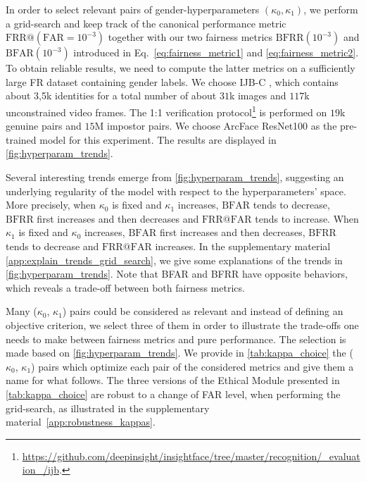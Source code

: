 \documentclass[nohyperref]{article}
\theoremstyle{plain}
\theoremstyle{definition}
\theoremstyle{remark}
\begin{document}
In order to select relevant pairs of gender-hyperparameters $(\kappa_0, \kappa_1)$, we perform a grid-search and keep track of the canonical performance metric $\mathrm{FRR}@(\mathrm{FAR}=10^{-3})$ together with our two fairness metrics $\mathrm{BFRR}(10^{-3})$ and $\mathrm{BFAR}(10^{-3})$ introduced in Eq.~\ref{eq:fairness_metric1} and \ref{eq:fairness_metric2}. To obtain reliable results, we need to compute the latter metrics on a sufficiently large FR dataset containing gender labels. We choose IJB-C \cite{maze2018iarpa}, which contains about 3,5k identities for a total number of about $31$k images and $117$k unconstrained video frames. The 1:1 verification protocol\footnote{\url{https://github.com/deepinsight/insightface/tree/master/recognition/_evaluation_/ijb}.}  is performed on $19$k genuine pairs and $15$M impostor pairs. We choose ArcFace ResNet100 as the pre-trained model for this experiment. The results are displayed in \autoref{fig:hyperparam_trends}.



Several interesting trends emerge from \autoref{fig:hyperparam_trends}, suggesting an underlying regularity of the model with respect to the hyperparameters' space. More precisely, when $\kappa_0$ is fixed and $\kappa_1$ increases, $\mathrm{BFAR}$ tends to decrease, $\mathrm{BFRR}$ first increases and then decreases and $\mathrm{FRR} @ \mathrm{FAR}$ tends to increase. When $\kappa_1$ is fixed and $\kappa_0$ increases, $\mathrm{BFAR}$ first increases and then decreases, $\mathrm{BFRR}$ tends to decrease and $\mathrm{FRR} @ \mathrm{FAR}$ increases. In the supplementary material \ref{app:explain_trends_grid_search}, we give some explanations of the trends in \autoref{fig:hyperparam_trends}. Note that BFAR and BFRR have opposite behaviors, which reveals a trade-off between both fairness metrics. 










Many  ($\kappa_0$, $\kappa_1$) pairs could be considered as relevant and instead of defining an objective criterion, we select three of them in order to illustrate the trade-offs one needs to make between fairness metrics and pure performance. The selection is made based on \autoref{fig:hyperparam_trends}. We provide in \autoref{tab:kappa_choice} the ($\kappa_0$, $\kappa_1$) pairs which optimize each pair of the  considered metrics and give them a name for what follows. The three versions of the Ethical Module presented in \autoref{tab:kappa_choice} are robust to a change of FAR level, when performing the grid-search, as illustrated in the supplementary material~\ref{app:robustness_kappas}.
\end{document}
